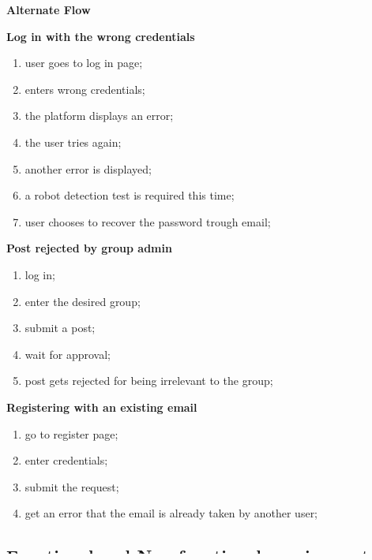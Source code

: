 \documentclass{article}
\begin{document}
			\begin{center}
				\textbf{Alternate Flow}
			\end{center}

				\textbf{Log in with the wrong credentials}
				\begin{enumerate}
					\item user goes to log in page;
					\item enters wrong credentials;
					\item the platform displays an error;
					\item the user tries again;
					\item another error is displayed;
					\item a robot detection test is required this time;
					\item user chooses to recover the password trough email;
				\end{enumerate}

				\textbf{Post rejected by group admin}
				\begin{enumerate}
					\item log in;
					\item enter the desired group;
					\item submit a post;
					\item wait for approval;
					\item post gets rejected for being irrelevant to the group;
				\end{enumerate}

				\textbf{Registering with an existing email}
				\begin{enumerate}
					\item go to register page;
					\item enter credentials;
					\item submit the request;
					\item get an error that the email is already taken by another user;
				\end{enumerate}


		\subsection{Functional and Non functional requirements}
			\begin{center}
				\textbf{Functional requirements}
			\end{center}

				\textbf{What will happen?}
				\begin{enumerate}
					\item Register user on the platform;
					\item Register a friend request;
					\item Register an event;
					\item Send email confirmation;
					\item Find requested users;
				\end{enumerate}
\end{document}
